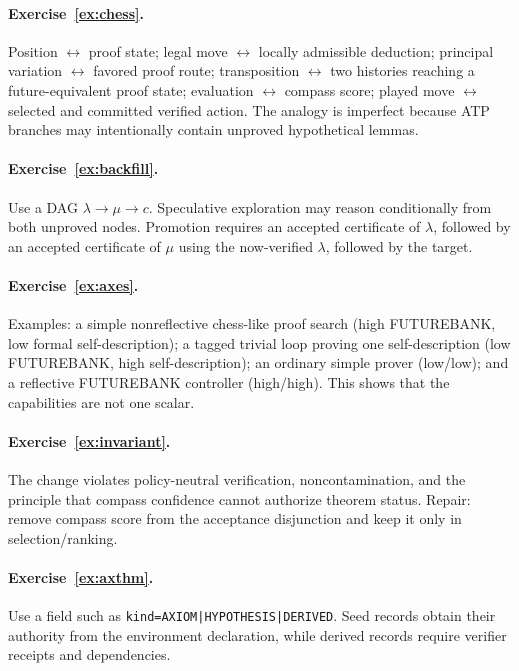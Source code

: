 \documentclass[11pt,openany]{book}
\theoremstyle{definition}
\theoremstyle{remark}
\begin{document}
\paragraph{Exercise~\ref{ex:chess}.}
Position $\leftrightarrow$ proof state; legal move $\leftrightarrow$ locally admissible deduction; principal variation $\leftrightarrow$ favored proof route; transposition $\leftrightarrow$ two histories reaching a future-equivalent proof state; evaluation $\leftrightarrow$ compass score; played move $\leftrightarrow$ selected and committed verified action. The analogy is imperfect because ATP branches may intentionally contain unproved hypothetical lemmas.

\paragraph{Exercise~\ref{ex:backfill}.}
Use a DAG $\lambda\to\mu\to c$. Speculative exploration may reason conditionally from both unproved nodes. Promotion requires an accepted certificate of $\lambda$, followed by an accepted certificate of $\mu$ using the now-verified $\lambda$, followed by the target.

\paragraph{Exercise~\ref{ex:axes}.}
Examples: a simple nonreflective chess-like proof search (high FUTUREBANK, low formal self-description); a tagged trivial loop proving one self-description (low FUTUREBANK, high self-description); an ordinary simple prover (low/low); and a reflective FUTUREBANK controller (high/high). This shows that the capabilities are not one scalar.

\paragraph{Exercise~\ref{ex:invariant}.}
The change violates policy-neutral verification, noncontamination, and the principle that compass confidence cannot authorize theorem status. Repair: remove compass score from the acceptance disjunction and keep it only in selection/ranking.

\paragraph{Exercise~\ref{ex:axthm}.}
Use a field such as \texttt{kind=AXIOM|HYPOTHESIS|DERIVED}. Seed records obtain their authority from the environment declaration, while derived records require verifier receipts and dependencies.
\end{document}
